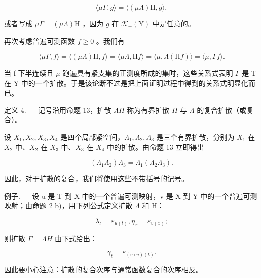 \[
\langle \mu \Gamma , g \rangle = \langle (\mu \Lambda) \mathrm{H}, g \rangle ,
\]

或者写成 \(\mu \Gamma = (\mu \Lambda)\mathrm{H}\) ，因为 \(g\) 在 \(\mathcal{K}_+(\mathrm{Y})\) 中是任意的。

再次考虑普遍可测函数 \(f \geqslant 0\) 。我们有

\[
\langle \mu \Gamma , f \rangle = \langle (\mu \Lambda) \mathrm{H}, f \rangle = \langle \mu \Lambda , \mathrm{H} f \rangle = \langle \mu , \Lambda (\mathrm{H} f) \rangle = \langle \mu , \Gamma f \rangle .
\]

当 f 下半连续且 \(\mu\) 跑遍具有紧支集的正测度所成的集时，这些关系式表明 \(\Gamma\) 是 T 在 Y 中的一个扩散。于是该论断不过是把上面证明过程中得到的关系式明显化而已。

定义 4. --- 记号沿用命题 13，扩散 \(\Lambda H\) 称为有界扩散 \(H\) 与 \(\Lambda\) 的复合扩散（或复合）。

设 \(X_{1}, X_{2}, X_{3}, X_{4}\) 是四个局部紧空间，\(\Lambda_{1}, \Lambda_{2}, \Lambda_{3}\) 是三个有界扩散，分别为 \(X_{1}\) 在 \(X_{2}\) 中、\(X_{2}\) 在 \(X_{3}\) 中、\(X_{3}\) 在 \(X_{4}\) 中的扩散。由命题 13 立即得出

\[
(\Lambda_ {1} \Lambda_ {2}) \Lambda_ {3} = \Lambda_ {1} (\Lambda_ {2} \Lambda_ {3}).
\]

因此，对于扩散的复合，我们将使用这些不带括号的记号。

例子. --- 设 u 是 T 到 X 中的一个普遍可测映射，v 是 X 到 Y 中的一个普遍可测映射；由命题 2 b)，用下列公式定义扩散 \(\Lambda\) 和 H：

\[
\lambda_ {t} = \varepsilon_ {u (t)}, \eta_ {x} = \varepsilon_ {v (x)};
\]

则扩散 \(\Gamma = \Lambda H\) 由下式给出：

\[
\gamma_ {t} = \varepsilon_ {(v \circ u) (t)}.
\]

因此要小心注意：扩散的复合次序与通常函数复合的次序相反。

